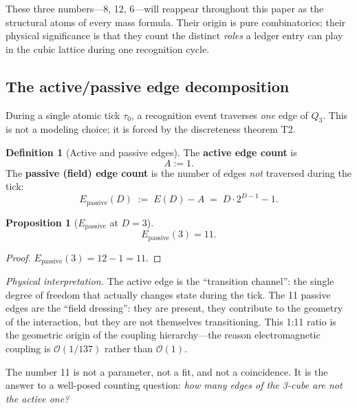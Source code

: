 \documentclass[11pt,a4paper]{article}
\newtheorem{proposition}[theorem]{Proposition}
\theoremstyle{definition}
\newtheorem{definition}[theorem]{Definition}
\theoremstyle{remark}
\newcommand{\Epass}{E_{\mathrm{passive}}}
\begin{document}
These three numbers---8, 12, 6---will reappear throughout this paper as the
structural atoms of every mass formula.  Their origin is pure combinatorics;
their physical significance is that they count the distinct \emph{roles} a
ledger entry can play in the cubic lattice during one recognition cycle.

\subsection{The active/passive edge decomposition}

During a single atomic tick $\tau_0$, a recognition event traverses
\emph{one} edge of $Q_3$.  This is not a modeling choice; it is forced by
the discreteness theorem T2.

\begin{definition}[Active and passive edges]
\label{def:active_passive}
The \textbf{active edge count} is
\begin{equation}
  A := 1.
  \label{eq:A}
\end{equation}
The \textbf{passive (field) edge count} is the number of edges \emph{not}
traversed during the tick:
\begin{equation}
  \Epass(D) \;:=\; E(D) - A \;=\; D \cdot 2^{D-1} - 1.
  \label{eq:Epass_general}
\end{equation}
\end{definition}

\begin{proposition}[$\Epass$ at $D = 3$]
\label{prop:Epass_D3}
\begin{equation}
  \boxed{\Epass(3) = 11.}
  \label{eq:Epass_11}
\end{equation}
\end{proposition}

\begin{proof}
$\Epass(3) = 12 - 1 = 11$.
\end{proof}

\noindent\textit{Physical interpretation.}\quad
The active edge is the ``transition channel'': the single degree of freedom
that actually changes state during the tick.  The 11 passive edges are the
``field dressing'': they are present, they contribute to the geometry of the
interaction, but they are not themselves transitioning.  This 1:11 ratio is
the geometric origin of the coupling hierarchy---the reason electromagnetic
coupling is $\mathcal{O}(1/137)$ rather than $\mathcal{O}(1)$.

The number 11 is not a parameter, not a fit, and not a coincidence.  It is
the answer to a well-posed counting question: \emph{how many edges of the
3-cube are not the active one?}
\end{document}
